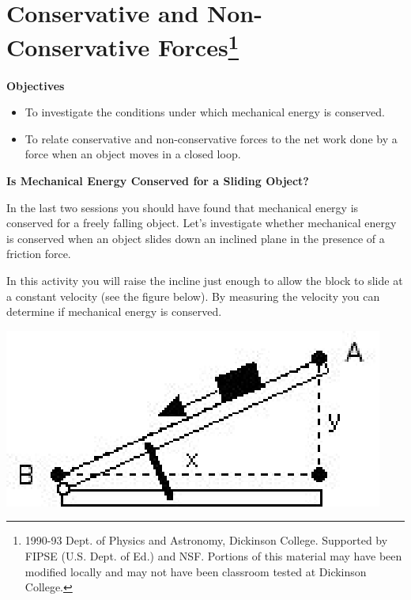 
\section{Conservative and Non-Conservative Forces\footnote{
1990-93 Dept. of Physics and Astronomy, Dickinson College. Supported by FIPSE
(U.S. Dept. of Ed.) and NSF. Portions of this material may have been modified
locally and may not have been classroom tested at Dickinson College.
}}

\makelabheader %

\textbf{Objectives} 

\begin{itemize}
\item To investigate the conditions under which mechanical energy is conserved. 
\item To relate conservative and non-conservative forces to the net work done by a
force when an object moves in a closed loop.
\end{itemize}
\textbf{Is Mechanical Energy Conserved for a Sliding Object? }

In the last two sessions you should have found that mechanical energy is conserved
for a freely falling object. Let's investigate whether mechanical energy is
conserved when an object slides down an inclined plane in the presence of a
friction force.

In this activity you will raise the incline just enough to allow the block to
slide at a constant velocity (see the figure below). By measuring the velocity
you can determine if mechanical energy is conserved.

\vspace{0.3cm}
{\par\centering \includegraphics{conservative/conservative_fig1.eps} \par}
\vspace{0.3cm}

